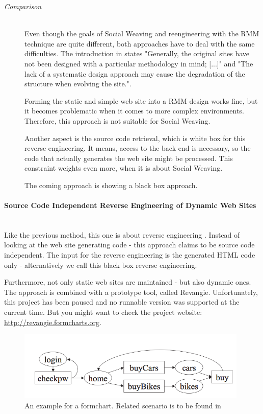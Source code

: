 \begin{enumerate}[A.]
\begin{description}
		\item[\emph{Comparison}]\mbox{}\\
		Even though the goals of Social Weaving and reengineering with the RMM technique are quite different, both approaches have to deal with the same difficulties. The introduction in \cite{antoniol2000web} states "Generally, the original sites have not been designed with a particular methodology in mind; [...]" and "The lack of a systematic design approach may cause the degradation of the structure when evolving the site.". 
		
		Forming the static and simple web site into a RMM design works fine, but it becomes problematic when it comes to more complex environments. Therefore, this approach is not suitable for Social Weaving.
		
		Another aspect is the source code retrieval, which is white box for this reverse engineering. It means, access to the back end is necessary, so the code that actually generates the web site might be processed. This constraint weights even more, when it is about Social Weaving.
		
		The coming approach is showing a black box approach.
	\end{description}	 

	\paragraph{Source Code Independent Reverse Engineering of Dynamic Web Sites}\mbox{}\\ 	
	Like the previous method, this one is about reverse engineering \cite{draheim2005source}. Instead of looking at the web site generating code - this approach claims to be source code independent. The input for the reverse engineering is the generated HTML code only - alternatively we call this black box reverse engineering.
	
	Furthermore, not only static web sites are maintained - but also dynamic ones. The approach is combined with a prototype tool, called Revangie\cite{draheim2004generator}. Unfortunately, this project has been paused and no runnable version was supported at the current time. But you might want to check the project website: \url{http://revangie.formcharts.org}. 
	
	\begin{figure}\centering
			\includegraphics[width=11cm]{images/revangie-formchart.png}
			\caption{An example for a formchart. Related scenario is to be found in \cite{draheim2005source}}
			\label{revangie-formchart}
	\end{figure} 
	

\end{enumerate}
